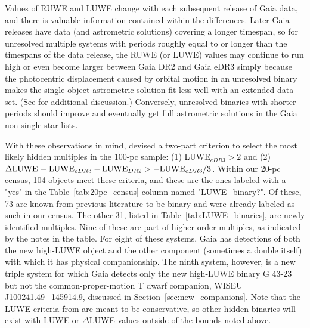 \documentclass[twocolumn,tighten,twocolappendix]{aastex631}
\begin{document}
Values of RUWE and LUWE change with each subsequent release of Gaia data, and there is valuable information contained within the differences. Later Gaia releases have data (and astrometric solutions) covering a longer timespan, so for unresolved multiple systems with periods roughly equal to or longer than the timespans of the data release, the RUWE (or LUWE) values may continue to run high or even become larger between Gaia DR2 and Gaia eDR3 simply because the photocentric displacement caused by orbital motion in an unresolved binary makes the single-object astrometric solution fit less well with an extended data set. (See \citealt{penoyre2022a} for additional discussion.) Conversely, unresolved binaries with shorter periods should improve and eventually get full astrometric solutions in the Gaia non-single star lists. 

With these observations in mind, \cite{penoyre2022b} devised a two-part criterion to select the most likely hidden multiples in the 100-pc sample: (1) LUWE$_{eDR3} > 2$ and (2) $\Delta{\rm LUWE} \equiv {\rm LUWE}_{eDR3} - {\rm LUWE}_{DR2} > - {\rm LUWE}_{eDR3}/3$. Within our 20-pc census, 104 objects meet these criteria, and these are the ones labeled with a "yes" in the Table~\ref{tab:20pc_census} column named "LUWE\_binary?". Of these, 73 are known from previous literature to be binary and were already labeled as such in our census. The other 31, listed in Table~\ref{tab:LUWE_binaries}, are newly identified multiples. Nine of these are part of higher-order multiples, as indicated by the notes in the table. For eight of these systems, Gaia has detections of both the new high-LUWE object and the other component (sometimes a double itself) with which it has physical companionship. The ninth system, however, is a new triple system for which Gaia detects only the new high-LUWE binary G 43-23 but not the common-proper-motion T dwarf companion, WISEU J100241.49+145914.9, discussed in Section~\ref{sec:new_companions}. Note that the LUWE criteria from \cite{penoyre2022b} are meant to be conservative, so other hidden binaries will exist with LUWE or $\Delta$LUWE values outside of the bounds noted above. 
\end{document}

